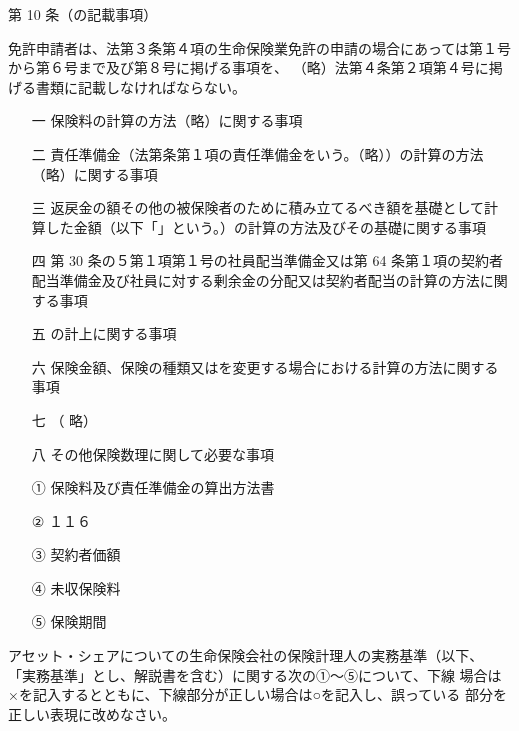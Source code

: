 \documentclass[report,gutter=10mm,fore-edge=10mm,uplatex,dvipdfmx]{jlreq}
\begin{document}
第 10 条（の記載事項）

免許申請者は、法第３条第４項の生命保険業免許の申請の場合にあっては第１号から第６号まで及び第８号に掲げる事項を、
（略）法第４条第２項第４号に掲げる書類に記載しなければならない。

\begin{itemize}
\item[ 一  ] 保険料の計算の方法（略）に関する事項
\item[ 二  ] 責任準備金（法第条第１項の責任準備金をいう。（略））の計算の方法（略）に関する事項
\item[ 三  ] 返戻金の額その他の被保険者のために積み立てるべき額を基礎として計算した金額（以下「」という。）の計算の方法及びその基礎に関する事項
\item[ 四  ] 第 30 条の５第１項第１号の社員配当準備金又は第 64 条第１項の契約者配当準備金及び社員に対する剰余金の分配又は契約者配当の計算の方法に関する事項
\item[ 五  ] の計上に関する事項
\item[ 六  ] 保険金額、保険の種類又はを変更する場合における計算の方法に関する事項
\item[ 七  ]（ 略）
\item[ 八  ] その他保険数理に関して必要な事項
\end{itemize}

\answer{}
\begin{itemize}
\item[ ① ] 保険料及び責任準備金の算出方法書 
\item[ ② ] １１６ 
\item[ ③ ] 契約者価額 
\item[ ④ ] 未収保険料
\item[ ⑤ ] 保険期間
\end{itemize}
\answer{}

アセット・シェアについての生命保険会社の保険計理人の実務基準（以下、
「実務基準」とし、解説書を含む）に関する次の①～⑤について、下線
場合は×を記入するとともに、下線部分が正しい場合は○を記入し、誤っている
部分を正しい表現に改めなさい。
\end{document}
